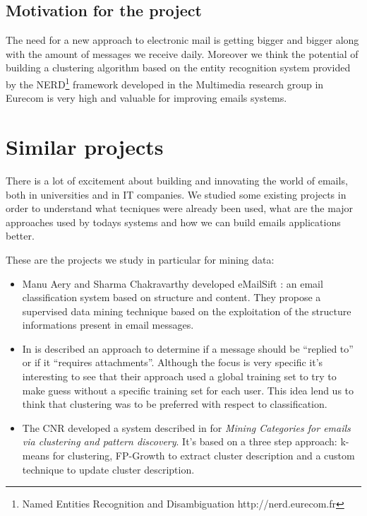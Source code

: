 \documentclass[a4paper,12pt]{report}
\begin{document}
\section*{Motivation for the project}

The need for a new approach to electronic mail is getting bigger and bigger along with the amount of messages we receive daily. Moreover we think the potential of building a clustering algorithm based on the entity recognition system provided by the NERD\footnote{Named Entities Recognition and Disambiguation http://nerd.eurecom.fr} framework developed in the Multimedia research group in Eurecom is very high and valuable for improving emails systems.


\chapter{Similar projects}

There is a lot of excitement about building and innovating the world of emails, both in universities and in IT companies. We studied some existing projects in order to understand what tecniques were already been used, what are the major approaches used by todays systems and how we can build emails applications better.


These are the projects we study in particular for mining data:
\begin{itemize}
\item Manu Aery and Sharma Chakravarthy developed eMailSift \cite{Aery2005}: an email classification system based on structure and content. They propose a supervised data mining technique based on the exploitation of the structure informations present in email messages.
\item In \cite{Drezde2008} is described an approach to determine if a message should be ``replied to'' or if it ``requires attachments''. Although the focus is very specific it's interesting to see that their approach used a global training set to try to make guess without a specific training set for each user. This idea lend us to think that clustering was to be preferred with respect to classification.
\item The CNR developed a system described in \cite{Manco2008} for \emph{Mining Categories for emails via clustering and pattern discovery}. It's based on a three step approach: k-means for clustering, FP-Growth to extract cluster description and a custom technique to update cluster description.
\end{itemize}
\end{document}
